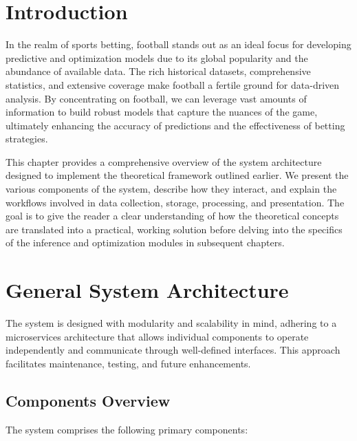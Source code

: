

\section{Introduction}

In the realm of sports betting, football stands out as an ideal focus for developing predictive and optimization models due to its global popularity and the abundance of available data. The rich historical datasets, comprehensive statistics, and extensive coverage make football a fertile ground for data-driven analysis. By concentrating on football, we can leverage vast amounts of information to build robust models that capture the nuances of the game, ultimately enhancing the accuracy of predictions and the effectiveness of betting strategies.

This chapter provides a comprehensive overview of the system architecture designed to implement the theoretical framework outlined earlier. We present the various components of the system, describe how they interact, and explain the workflows involved in data collection, storage, processing, and presentation. The goal is to give the reader a clear understanding of how the theoretical concepts are translated into a practical, working solution before delving into the specifics of the inference and optimization modules in subsequent chapters.

\section{General System Architecture}

The system is designed with modularity and scalability in mind, adhering to a microservices architecture \cite{Newman2015} that allows individual components to operate independently and communicate through well-defined interfaces. This approach facilitates maintenance, testing, and future enhancements.

\subsection{Components Overview}

The system comprises the following primary components:

